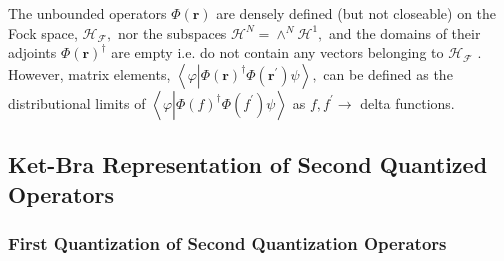 \documentclass[aps,preprint]{revtex4}%
\begin{document}
The unbounded operators $\Phi\left(  \boldsymbol{r}\right)  $ are densely
defined (but not closeable) on the Fock space, $\mathcal{H}_{\mathcal{F}},$
nor the subspaces $\mathcal{H}^{N}=\wedge^{N}\mathcal{H}^{1},$ and the domains
of their adjoints $\Phi\left(  \boldsymbol{r}\right)  ^{\dagger}$ are empty
i.e. do not contain any vectors belonging to $\mathcal{H}_{\mathcal{F}}$
\cite{Thirring}. However, matrix elements, $\left\langle \varphi\left\vert
\Phi\left(  \boldsymbol{r}\right)  ^{\dagger}\Phi\left(  \boldsymbol{r}%
^{\prime}\right)  \right.  \psi\right\rangle ,$ can be defined as the
distributional limits of $\left\langle \varphi\left\vert \Phi\left(  f\right)
^{\dagger}\Phi\left(  f^{\prime}\right)  \right.  \psi\right\rangle $ as
$f,f^{\prime}\rightarrow$ delta functions.

\subsection{Ket-Bra Representation of Second Quantized Operators}

\subsubsection{First Quantization of Second Quantization Operators}
\end{document}
